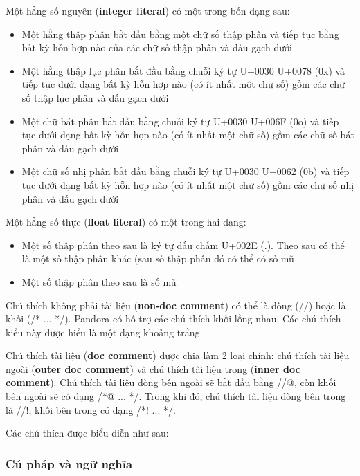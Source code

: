    \regexrawstringliteral

    Một hằng số nguyên (\textbf{integer literal}) có một trong bốn dạng sau:

    \begin{itemize}
        \item{Một hằng thập phân bắt đầu bằng một chữ số thập phân và tiếp tục bằng bất kỳ hỗn hợp nào của các chữ số thập phân và dấu gạch dưới}
        \item{Một hằng thập lục phân bắt đầu bằng chuỗi ký tự U+0030 U+0078 (0x) và tiếp tục dưới dạng bất kỳ hỗn hợp nào (có ít nhất một chữ số) gồm các chữ số thập lục phân và dấu gạch dưới}
        \item{Một chữ bát phân bắt đầu bằng chuỗi ký tự U+0030 U+006F (0o) và tiếp tục dưới dạng bất kỳ hỗn hợp nào (có ít nhất một chữ số) gồm các chữ số bát phân và dấu gạch dưới}
        \item{Một chữ số nhị phân bắt đầu bằng chuỗi ký tự U+0030 U+0062 (0b) và tiếp tục dưới dạng bất kỳ hỗn hợp nào (có ít nhất một chữ số) gồm các chữ số nhị phân và dấu gạch dưới}
    \end{itemize}

    \regexintegerliteral

    Một hằng số thực (\textbf{float literal}) có một trong hai dạng:
    \begin{itemize}
        \item{Một số thập phân theo sau là ký tự dấu chấm U+002E (.). Theo sau có thể là một số thập phân khác (sau số thập phân đó có thể có số mũ}
        \item{Một số thập phân theo sau là số mũ}
    \end{itemize}

    \regexfloatliteral

    Chú thích không phải tài liệu (\textbf{non-doc comment}) có thể là dòng (//) hoặc là khối (/* ... */). Pandora có hỗ trợ các chú thích khối lồng nhau. Các chú thích kiểu này được hiểu là một dạng khoảng trắng.

    Chú thích tài liệu (\textbf{doc comment}) được chia làm 2 loại chính: chú thích tài liệu ngoài (\textbf{outer doc comment}) và chú thích tài liệu trong (\textbf{inner doc comment}). Chú thích tài liệu dòng bên ngoài sẽ bắt đầu bằng //@, còn khối bên ngoài sẽ có dạng /*@ ... */. Trong khi đó, chú thích tài liệu dòng bên trong là //!, khối bên trong có dạng /*! ... */.

    Các chú thích được biểu diễn như sau:

    \regexlinecomment

    \regexblockcomment

    \regexdoc

\subsubsection{Cú pháp và ngữ nghĩa}
